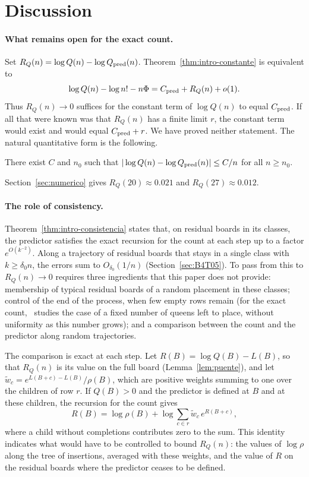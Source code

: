 \section{Discussion}\label{sec:discusion}

\paragraph{What remains open for the exact count.}
Set $R_Q(n)=\log Q(n)-\log Q_{\rm pred}(n)$. Theorem~\ref{thm:intro-constante} is equivalent to
\[
 \log Q(n)-\log n!-n\Phi=C_{\rm pred}+R_Q(n)+o(1).
\]
Thus $R_Q(n)\to0$ suffices for the constant term of $\log Q(n)$ to equal $C_{\rm pred}$. If
all that were known was that $R_Q(n)$ has a finite limit $r$, the constant term would exist and would equal
$C_{\rm pred}+r$. We have proved neither statement. The natural quantitative form is the following.

\begin{conjetura}\label{conj:RQ}
There exist $C$ and $n_0$ such that $|\log Q(n)-\log Q_{\rm pred}(n)|\le C/n$ for all $n\ge n_0$.
\end{conjetura}

Section~\ref{sec:numerico} gives $R_Q(20)\approx0.021$ and $R_Q(27)\approx0.012$.

\paragraph{The role of consistency.}
Theorem~\ref{thm:intro-consistencia} states that, on residual boards in its classes, the predictor satisfies
the exact recursion for the count at each step up to a factor $e^{O(k^{-2})}$. Along a trajectory of
residual boards that
stays in a single class with $k\ge\delta_0n$, the errors sum to $O_{\delta_0}(1/n)$
(Section~\ref{sec:B4T05}). To pass from this to $R_Q(n)\to0$ requires three ingredients that this paper
does not provide: membership of typical residual boards of a random placement in these classes; control of
the end of the process, when few empty rows remain (for the exact count,~\cite{Completabilidad} studies the
case of
a fixed number of queens left to place, without uniformity as this number grows); and a comparison between
the count and the predictor along random trajectories.

The comparison is exact at each step. Let $R(B)=\log Q(B)-L(B)$, so that $R_Q(n)$ is its value on
the full board (Lemma~\ref{lem:puente}), and let $\tilde w_c=e^{L(B+c)-L(B)}/\rho(B)$, which are positive
weights summing to one over the children of row $r$. If $Q(B)>0$ and the predictor is defined at $B$
and at these children, the recursion for the count gives
\[
 R(B)=\log\rho(B)+\log\sum_{c\in r}\tilde w_c\,e^{R(B+c)},
\]
where a child without completions contributes zero to the sum. This identity indicates what would have
to be controlled to bound $R_Q(n)$: the values of $\log\rho$ along the tree of insertions, averaged
with these weights, and the value of $R$ on the residual boards where the predictor ceases to be
defined.

